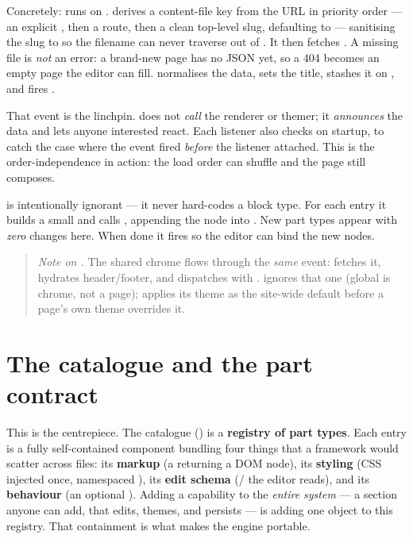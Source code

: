 \documentclass[11pt]{article}
\begin{document}
Concretely:  runs on . 
derives a content-file key from the URL in priority order --- an explicit
, then a  route, then a clean
top-level slug, defaulting to  --- sanitising the slug to
\code{[a-z0-9-]} so the filename can never traverse out of . It then
fetches . A missing file is \emph{not} an error: a
brand-new page has no JSON yet, so a 404 becomes an empty page the editor can
fill.  normalises the data, sets the title, stashes it on
, and fires .

That event is the linchpin.  does not \emph{call} the renderer or
themer; it \emph{announces} the data and lets anyone interested react. Each
listener also checks  on startup, to catch the
case where the event fired \emph{before} the listener attached. This is the
order-independence in action: the load order can shuffle and the page still
composes.

 is intentionally ignorant --- it never hard-codes a block
type. For each entry it builds a small  and calls
, appending the node into
. New part types appear with \emph{zero} changes here.
When done it fires  so the editor can bind the new nodes.

\begin{quote}
\small\emph{Note on .} The shared chrome flows through the
\emph{same} event:  fetches it, hydrates header/footer, and
dispatches  with . 
ignores that one (global is chrome, not a page);  applies its
theme as the site-wide default before a page's own theme overrides it.
\end{quote}

\section{The catalogue and the part contract}
\label{sec:catalogue}

This is the centrepiece. The catalogue () is a \textbf{registry
of part types}. Each entry is a fully self-contained component bundling four
things that a framework would scatter across files: its \textbf{markup} (a
 returning a DOM node), its \textbf{styling} (CSS injected once,
namespaced ), its \textbf{edit schema}
(/ the editor reads), and its \textbf{behaviour}
(an optional ). Adding a capability to the \emph{entire system} ---
a section anyone can add, that edits, themes, and persists --- is adding one
object to this registry. That containment is what makes the engine portable.
\end{document}
